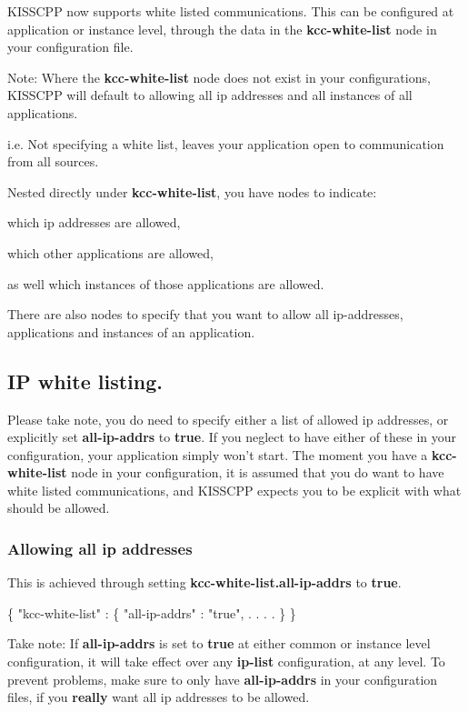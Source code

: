 K\-I\-S\-S\-C\-P\-P now supports white listed communications. This can be configured at application or instance level, through the data in the {\bfseries kcc-\/white-\/list} node in your configuration file.

Note\-: Where the {\bfseries kcc-\/white-\/list} node does not exist in your configurations, K\-I\-S\-S\-C\-P\-P will default to allowing all ip addresses and all instances of all applications.

i.\-e. Not specifying a white list, leaves your application open to communication from all sources.

Nested directly under {\bfseries kcc-\/white-\/list}, you have nodes to indicate\-:
\begin{DoxyItemize}
\item which ip addresses are allowed,
\item which other applications are allowed,
\item as well which instances of those applications are allowed.
\item There are also nodes to specify that you want to allow all ip-\/addresses, applications and instances of an application.
\end{DoxyItemize}

\subsection*{I\-P white listing.}

Please take note, you do need to specify either a list of allowed ip addresses, or explicitly set {\bfseries all-\/ip-\/addrs} to {\bfseries true}. If you neglect to have either of these in your configuration, your application simply won't start. The moment you have a {\bfseries kcc-\/white-\/list} node in your configuration, it is assumed that you do want to have white listed communications, and K\-I\-S\-S\-C\-P\-P expects you to be explicit with what should be allowed.

\subsubsection*{Allowing all ip addresses}

This is achieved through setting {\bfseries kcc-\/white-\/list.\-all-\/ip-\/addrs} to {\bfseries true}. 
\begin{DoxyCode}
\{
  \textcolor{stringliteral}{"kcc-white-list"} : \{
    \textcolor{stringliteral}{"all-ip-addrs"} : \textcolor{stringliteral}{"true"},
    .
    .
    .
    .
  \}
\}
\end{DoxyCode}
 Take note\-: If {\bfseries all-\/ip-\/addrs} is set to {\bfseries true} at either common or instance level configuration, it will take effect over any {\bfseries ip-\/list} configuration, at any level. To prevent problems, make sure to only have {\bfseries all-\/ip-\/addrs} in your configuration files, if you {\bfseries really} want all ip addresses to be allowed.

